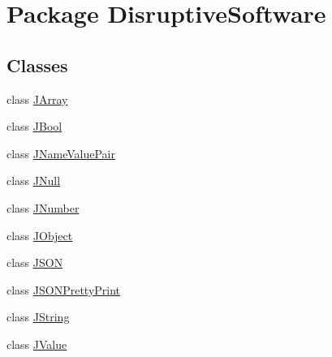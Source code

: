 \hypertarget{namespace_disruptive_software}{\section{Package Disruptive\+Software}
\label{namespace_disruptive_software}
}
\subsection*{Classes}
\begin{DoxyCompactItemize}
\item 
class \hyperlink{class_disruptive_software_1_1_j_array}{J\+Array}
\item 
class \hyperlink{class_disruptive_software_1_1_j_bool}{J\+Bool}
\item 
class \hyperlink{class_disruptive_software_1_1_j_name_value_pair}{J\+Name\+Value\+Pair}
\item 
class \hyperlink{class_disruptive_software_1_1_j_null}{J\+Null}
\item 
class \hyperlink{class_disruptive_software_1_1_j_number}{J\+Number}
\item 
class \hyperlink{class_disruptive_software_1_1_j_object}{J\+Object}
\item 
class \hyperlink{class_disruptive_software_1_1_j_s_o_n}{J\+S\+O\+N}
\item 
class \hyperlink{class_disruptive_software_1_1_j_s_o_n_pretty_print}{J\+S\+O\+N\+Pretty\+Print}
\item 
class \hyperlink{class_disruptive_software_1_1_j_string}{J\+String}
\item 
class \hyperlink{class_disruptive_software_1_1_j_value}{J\+Value}
\end{DoxyCompactItemize}
